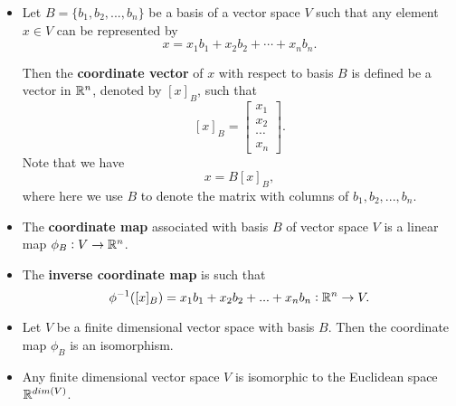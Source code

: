 \begin{refsection}
\begin{definition}\hfill
\begin{itemize}
	\item Let $B = \{b_1,b_2,...,b_n\} $ be a basis of a vector space $V$ such that any element $x\in V$ can be represented by
	$$x = x_1b_1 + x_2b_2+\cdots + x_nb_n.$$
	
	Then the \textbf{coordinate vector} of $x$ with respect to basis $B$ is defined be a vector in $\mathbb{R}^n$, denoted by $[x]_B$, such that $$[x]_B = \begin{bmatrix}
	x_1\\
	x_2\\
	\cdots \\
	x_n
	\end{bmatrix}.$$
	Note that we have
	$$x = B[x]_B,$$
	where here we use $B$ to denote the matrix with columns of $b_1,b_2,...,b_n$.
	\item The \textbf{coordinate map} associated with basis $B$ of vector space $V$ is a linear map $\phi_B: V\to \mathbb{R}^n$.
	\item The \textbf{inverse coordinate map} is such that
	$$\phi^{-1}([x]_B) = x_1b_1 + x_2b_2 + ... +x_nb_n: \mathbb{R}^n\to V.$$	
\end{itemize}	
\end{definition}

\begin{lemma}[]
\begin{itemize}
	\item Let $V$ be a finite dimensional vector space with basis $B$. Then the coordinate map $\phi_B$ is an isomorphism.
	\item Any finite dimensional vector space $V$ is isomorphic to the Euclidean space $\mathbb{R}^{dim(V)}$. 
\end{itemize}	
	
\end{lemma}



\end{refsection}
